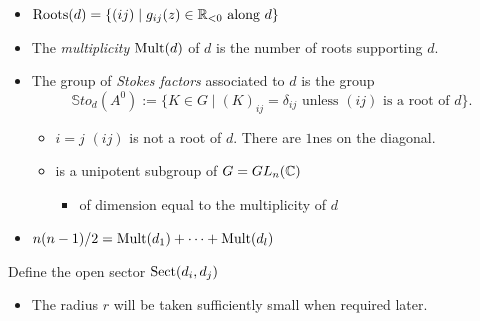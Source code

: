 \begin{defn}
  \begin{itemize}
    \item $\operatorname{Roots}(d)=\{(ij)\mid g_{ij}(z)\in \mathbb{R}_{<0} \text{ along } d \}$
    \item The \emph{multiplicity} $\operatorname{Mult}(d)$ of $d$ is the number of roots
      supporting $d$.
    \item The group of \emph{Stokes factors} associated to $d$ is the group
    \[
      \mathbb{S}to_d(A^0) := \{K \in G \mid (K)_{ij}
        =\delta_{ij} \text{ unless } (ij) \text{ is a root of } d\}.
    \]
    \begin{itemize}
      \item $i=j$ \Rightarrow $(ij)$ is not a root of $d$. There are $1$nes
        on the diagonal.
      \item is a unipotent subgroup of $G=GL_n(\mathbb{C})$
        \begin{itemize}
          \item of dimension equal to the multiplicity of $d$
        \end{itemize}
    \end{itemize}
    \item $n(n-1)/2=\operatorname{Mult}(d_1)+\dots+\operatorname{Mult}(d_l)$
  \end{itemize}
\end{defn}
\begin{defn}
  Define the open sector $\operatorname{Sect}(d_i,d_j)$
  \begin{center}
  \end{center}
  \begin{itemize}
    \item The radius \textcolor{green!40!black}{$r$} will be taken sufficiently
      small when required later.
  \end{itemize}
\end{defn}
